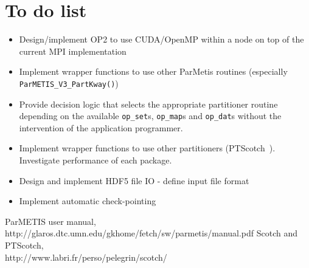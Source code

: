 \documentclass[12pt]{article}
\begin{document}
\section{To do list}
\begin{itemize}
\item Design/implement OP2 to use CUDA/OpenMP within a node on top of the current MPI implementation
\item Implement wrapper functions to use other ParMetis routines (especially \texttt{ParMETIS\_V3\_PartKway()})
\item Provide decision logic that selects the appropriate partitioner routine depending on the available
\texttt{op\_set}s, \texttt{op\_map}s and \texttt{op\_dat}s without the intervention of the application programmer.
\item Implement wrapper functions to use other partitioners (PTScotch~\cite{PTScotch}). Investigate performance of each
package. 
\item Design and implement HDF5 file IO - define input file format
\item Implement automatic check-pointing
\end{itemize}



\begin{thebibliography}{9}

 ParMETIS user manual,\\http://glaros.dtc.umn.edu/gkhome/fetch/sw/parmetis/manual.pdf
 Scotch and PTScotch,\\http://www.labri.fr/perso/pelegrin/scotch/

  
\end{thebibliography}
\end{document}
